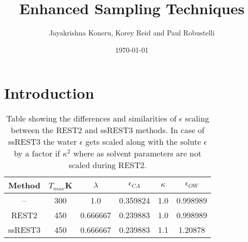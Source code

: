 \documentclass{book}
\begin{document}
\title{Enhanced Sampling Techniques}
\author{Jayakrishna Koneru, Korey Reid and Paul Robustelli}
\date{\today}

\maketitle

\tableofcontents

\chapter{Introduction}

\begin{table}[h!]
\centering
\begin{tabular}{|c|c|c|c|c|c|}
\hline
Method & $T_{max}$K & $\lambda$ & $\epsilon_{CA}$ & $\kappa$ & $\epsilon_{OW}$ \\
\hline
-- & 300 & 1.0 & 0.359824 & 1.0 & 0.998989 \\
\hline
REST2 & 450 & 0.666667 & 0.239883 & 1.0 & 0.998989 \\
\hline
ssREST3 & 450 & 0.666667 & 0.239883 & 1.1 & 1.20878 \\

\hline
\end{tabular}
\caption{Table showing the differences and similarities of $\epsilon$ scaling between the REST2 and ssREST3 methods. In case of ssREST3 the 
water $\epsilon$ gets scaled along with the solute $\epsilon$ by a factor if $\kappa^{2}$ where as solvent parameters are not scaled during REST2.}
\label{tab:eps_table}
\end{table}
\end{document}

